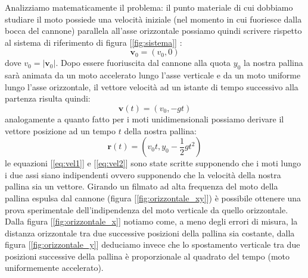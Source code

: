 \documentclass[a4paper,10pt,oneside]{article}
\begin{document}
Analizziamo matematicamente il problema: il punto materiale di cui dobbiamo studiare il moto possiede una velocità iniziale (nel momento in cui fuoriesce dalla bocca del cannone) parallela all'asse orizzontale possiamo quindi scrivere rispetto al sistema di riferimento di figura [\ref{fig:sistema}] :
\begin{equation}
 \mathbf{v}_0=(v_0,0)
\end{equation}
dove $v_0=|\mathbf{v}_0|$. Dopo essere fuoriuscita dal cannone alla quota $y_0$ la nostra pallina sarà animata da un moto accelerato lungo l'asse verticale e da un moto uniforme lungo l'asse orizzontale, il vettore velocità ad un istante di tempo successivo alla partenza risulta quindi:
\begin{equation}\label{eq:vel1}
 \mathbf{v}(t)=(v_0,-gt)
\end{equation}
analogamente a quanto fatto per i moti unidimensionali possiamo derivare il vettore posizione ad un tempo $t$ della nostra pallina:
\begin{equation}\label{eq:vel2}
 \mathbf{r}(t)=(v_0t,y_0-\frac{1}{2}gt^2)
\end{equation}
le equazioni [\ref{eq:vel1}] e [\ref{eq:vel2}] sono state scritte supponendo che i moti lungo i due assi siano indipendenti ovvero supponendo che la velocità della nostra pallina sia un vettore.
Girando un filmato ad alta frequenza del moto della pallina espulsa dal cannone (figura [\ref{fig:orizzontale_xy}]) è possibile ottenere una prova sperimentale dell'indipendenza del moto verticale da quello orizzontale. Dalla figura [\ref{fig:orizzontale_x}] notiamo come, a meno degli errori di misura, la distanza orizzontale tra due successive posizioni della pallina sia costante, dalla figura [\ref{fig:orizzontale_y}] deduciamo invece che lo spostamento verticale tra due posizioni successive della pallina è proporzionale al quadrato del tempo (moto uniformemente accelerato).
\end{document}
